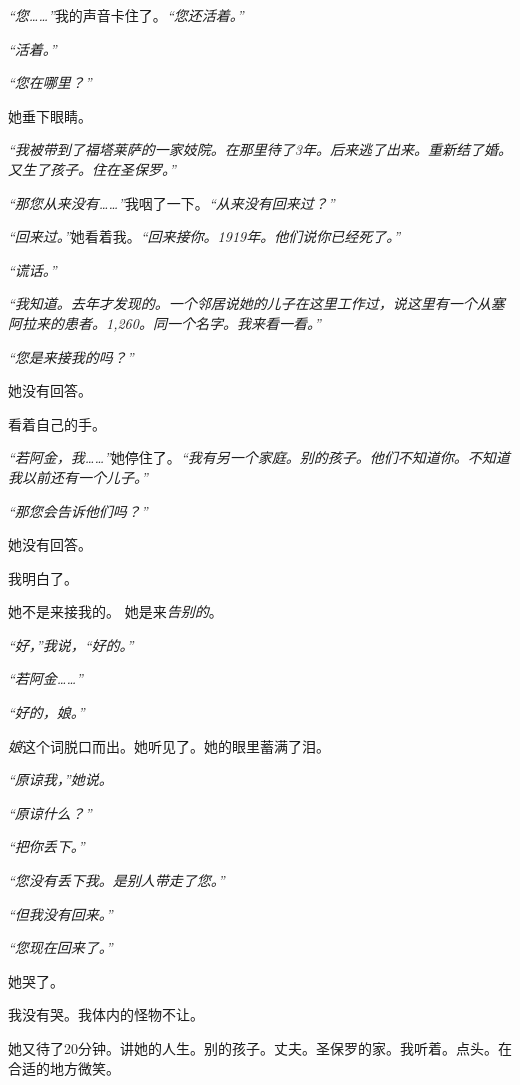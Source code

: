 \noindent \textit{“您……”}我的声音卡住了。\textit{“您还活着。”}

\noindent \textit{“活着。”}

\noindent \textit{“您在哪里？”}

\noindent 她垂下眼睛。

\noindent \textit{“我被带到了福塔莱萨的一家妓院。在那里待了3年。后来逃了出来。重新结了婚。又生了孩子。住在圣保罗。”}

\noindent \textit{“那您从来没有……”}我咽了一下。\textit{“从来没有回来过？”}

\noindent \textit{“回来过。”}她看着我。\textit{“回来接你。1919年。他们说你已经死了。”}

\noindent \textit{“谎话。”}

\noindent \textit{“我知道。去年才发现的。一个邻居说她的儿子在这里工作过，说这里有一个从塞阿拉来的患者。1,260。同一个名字。我来看一看。”}

\noindent \textit{“您是来接我的吗？”}

\noindent 她没有回答。

\noindent 看着自己的手。

\noindent \textit{“若阿金，我……”}她停住了。\textit{“我有另一个家庭。别的孩子。他们不知道你。不知道我以前还有一个儿子。”}

\noindent \textit{“那您会告诉他们吗？”}

\noindent 她没有回答。

\noindent 我明白了。

\noindent 她不是来接我的。
她是来\textit{告别的}。

\noindent \textit{“好，”我说，“好的。”}

\noindent \textit{“若阿金……”}

\noindent \textit{“好的，娘。”}

\noindent \textit{娘}这个词脱口而出。她听见了。她的眼里蓄满了泪。

\noindent \textit{“原谅我，”她说。}

\noindent \textit{“原谅什么？”}

\noindent \textit{“把你丢下。”}

\noindent \textit{“您没有丢下我。是别人带走了您。”}

\noindent \textit{“但我没有回来。”}

\noindent \textit{“您现在回来了。”}

\noindent 她哭了。

\noindent 我没有哭。我体内的怪物不让。

\noindent 她又待了20分钟。讲她的人生。别的孩子。丈夫。圣保罗的家。我听着。点头。在合适的地方微笑。

